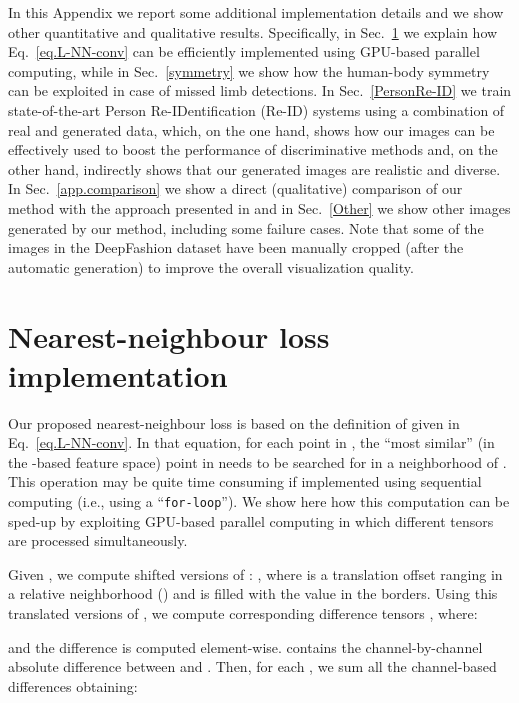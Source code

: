 \documentclass[10pt,twocolumn,letterpaper]{article}
\begin{document}
In this Appendix we report some additional implementation details and we show other quantitative and qualitative results.
Specifically, in Sec.~\ref{GPU} we explain how Eq.~\ref{eq.L-NN-conv} can be efficiently implemented using GPU-based parallel computing, while in Sec.~\ref{symmetry} we show how the human-body symmetry can be exploited in case of missed limb detections.
In Sec.~\ref{PersonRe-ID} we train state-of-the-art Person Re-IDentification (Re-ID) systems using a combination of real and generated data, which, on the one hand, shows how our images can be effectively used to boost the performance of discriminative methods and, on the other hand, indirectly shows that our generated images are realistic and diverse.
In Sec.~\ref{app.comparison} we show a direct (qualitative) comparison of our method with the approach presented in \cite{ma2017pose} and 
 in Sec.~\ref{Other} we show other images generated by our method, including some failure cases.
Note that some of the images in the DeepFashion dataset have been manually cropped (after the automatic generation) to improve the overall visualization quality.

\section{Nearest-neighbour loss implementation}
\label{GPU}

Our proposed nearest-neighbour loss 
is based on the  definition of  given in Eq.~\ref{eq.L-NN-conv}.
In that equation, for each point  in , the ``most similar'' (in the -based feature space) point  in  needs to be searched for in a  neighborhood of .
This operation may be quite time consuming if implemented using sequential computing (i.e., using a ``\texttt{for-loop}'').
We show here how this computation can be 
sped-up by exploiting GPU-based parallel computing in which different tensors are processed simultaneously. 

Given  , we  compute  
shifted versions of : , where  is a translation offset ranging in a relative  neighborhood
()  
and 
is filled with the value  in the borders. Using this translated versions of  ,
we compute  corresponding difference tensors , where:




\noindent
and the difference is computed element-wise.  contains the channel-by-channel  absolute difference between 
  and .
 Then, for each , we sum all the channel-based differences obtaining:  

 
\end{document}
